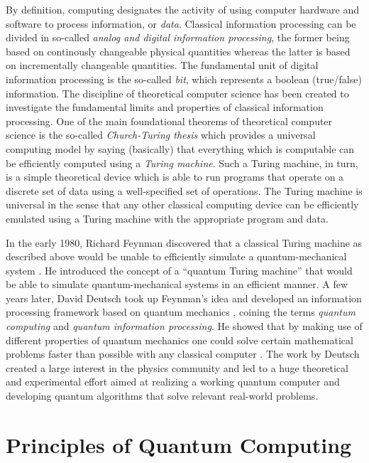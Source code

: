 By definition, computing designates the activity of using computer hardware and software to process information, or {\it data}. Classical information processing can be divided in so-called {\it analog and digital information processing}, the former being based on continously changeable physical quantities whereas the latter is based on incrementally changeable quantities. The fundamental unit of digital information processing is the so-called {\it bit}, which represents a boolean (true/false) information. The discipline of theoretical computer science has been created to investigate the fundamental limits and properties of classical information processing. One of the main foundational theorems of theoretical computer science is the so-called {\it Church-Turing thesis} which provides a universal computing model by saying (basically) that everything which is computable can be efficiently computed using a {\it Turing machine}. Such a Turing machine, in turn, is a simple theoretical device which is able to run programs that operate on a discrete set of data using a well-specified set of operations. The Turing machine is universal in the sense that any other classical computing device can be efficiently emulated using a Turing machine with the appropriate program and data.

\smallskip

In the early 1980, Richard Feynman discovered that a classical Turing machine as described above would be unable to efficiently simulate a quantum-mechanical system \citep{feynman_simulating_1982}. He introduced the concept of a ``quantum Turing machine'' that would be able to simulate quantum-mechanical systems in an efficient manner. A few years later, David Deutsch took up Feynman's idea and developed an information processing framework based on quantum mechanics \citep{deutsch_quantum_1985}, coining the terms {\it quantum computing} and {\it quantum information processing}. He showed that by making use of different properties of quantum mechanics one could solve certain mathematical problems faster than possible with any classical computer \citep{deutsch_quantum_1985}. The work by Deutsch created a large interest in the physics community and led to a huge theoretical and experimental effort aimed at realizing a working quantum computer and developing quantum algorithms that solve relevant real-world problems.

\section{Principles of Quantum Computing}

